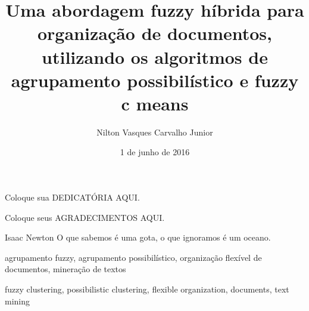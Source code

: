 \documentclass[bsc, classic, a4paper]{ufbathesis}
\institute{INSTITUTO DE MATEMÁTICA}
\title{Uma abordagem fuzzy híbrida para organização de documentos, utilizando os algoritmos de agrupamento possibilístico e fuzzy c means }
\date{1 de junho de 2016}
\author{Nilton Vasques Carvalho Junior}
\begin{document}
\pgcompfrontpage{}

\frontmatter

\pgcomppresentationpage

\catalogingsheet


\begin{dedicatory}
Coloque sua DEDICATÓRIA AQUI.
\end{dedicatory}

\acknowledgements
Coloque seus AGRADECIMENTOS AQUI.

\begin{epigraph}[1687]{Isaac Newton}
  O que sabemos é uma gota, o que ignoramos é um oceano.
\end{epigraph}

\resumo

\begin{keywords}
agrupamento fuzzy, agrupamento possibilístico, organização flexível de documentos, 
mineração de textos
\end{keywords}

\abstract

\begin{keywords}
fuzzy clustering, possibilistic clustering, flexible organization, documents, text mining
\end{keywords}
\end{document}
